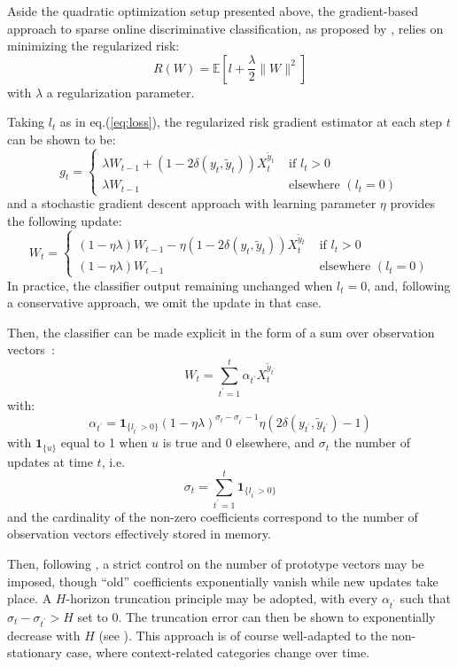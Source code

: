 \documentclass[preprint,12pt,authoryear]{elsarticle}
\begin{document}
Aside the quadratic optimization setup presented above, the gradient-based approach to sparse online discriminative classification, as proposed by \cite{kivinen2004online}, relies on minimizing the regularized risk:
$$R(W) = \mathbb{E}\left[ l + \frac{\lambda}{2}\|W\|^2\right]$$
with $\lambda$ a regularization parameter.

Taking $l_t$ as in eq.(\ref{eq:loss}), the regularized risk gradient estimator at each step $t$ can be shown to be:
$$g_t = \left\{
\begin{array}{ll}
\lambda W_{t-1} + (1 - 2 \delta(y_t,\tilde{y}_t)) X_t^{\tilde{y}_t} &\text{ if } l_t > 0\\
\lambda W_{t-1} &\text{ elsewhere }(l_t=0)
\end{array}
\right.$$
and a stochastic gradient descent approach with learning parameter $\eta$ provides the following update:
$$W_t =  \left\{
\begin{array}{ll}
(1-\eta\lambda) W_{t-1} - \eta (1 - 2 \delta(y_t,\tilde{y}_t)) X_t^{\tilde{y}_t} &\text{ if } l_t > 0\\
(1-\eta\lambda) W_{t-1} &\text{ elsewhere }(l_t = 0)
\end{array}
\right.$$
In practice, the classifier output remaining unchanged when $l_t = 0$, and, following a conservative approach, we omit the update in that case. 

Then, the classifier can be made explicit in the form of a sum over observation vectors~:
$$W_t = \sum_{t^\prime=1}^t \alpha_{t^\prime} X_t^{\tilde{y}_{t^\prime}}$$
with:
$$\alpha_{t^\prime} = \mathbf{1}_{\{l_{t^\prime} > 0\}}(1 - \eta \lambda)^{\sigma_t - \sigma_{t^\prime}-1}  \eta (2\delta(y_{t^\prime},\tilde{y}_{t^\prime})-1)$$
with $\mathbf{1}_{\{u\}}$ equal to 1 when $u$ is true and 0 elsewhere, and $\sigma_t$  the number of updates at time $t$, i.e.
$$\sigma_t = \sum_{t^\prime=1}^t \mathbf{1}_{\{l_{t^\prime} > 0\}}$$  
and the cardinality of the non-zero coefficients correspond to the number of observation vectors effectively stored in memory.

Then, following \cite{kivinen2004online}, a strict control on the number of prototype vectors may be imposed, though ``old'' coefficients exponentially vanish while new updates take place. A $H$-horizon truncation principle may be adopted, with every $\alpha_{t^\prime}$ such that $\sigma_t - \sigma_{t^\prime} > H$ set to 0. The truncation error can then be shown to  exponentially decrease with $H$ (see \cite{kivinen2004online}). This approach is of course well-adapted to the non-stationary case, where context-related categories change over time.
\end{document}
